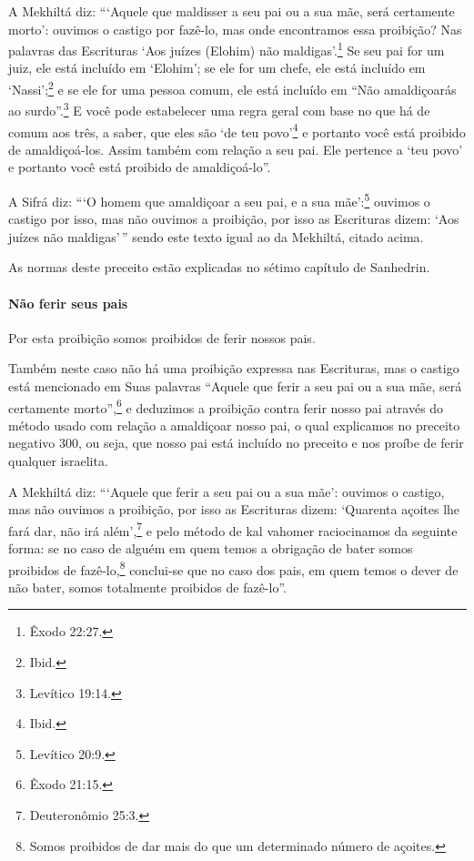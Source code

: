 A Mekhiltá diz: ```Aquele que maldisser a seu pai ou a sua mãe, será
certamente morto': ouvimos o castigo por fazê-lo, mas onde encontramos
essa proibição? Nas palavras das Escrituras `Aos juízes (Elohim) não
maldigas'.\footnote{Êxodo 22:27.} Se seu pai for um juiz, ele está incluído em
`Elohim'; se ele for um chefe, ele está incluído em
`Nassi';\footnote{Ibid.} e se ele for uma pessoa comum, ele está incluído em
``Não amaldiçoarás ao surdo''.\footnote{Levítico 19:14.} E você pode estabelecer
uma regra geral com base no que há de comum aos três, a saber, que eles
são `de teu povo'\footnote{Ibid.} e portanto você está proibido de
amaldiçoá-los. Assim também com relação a seu pai. Ele pertence a `teu
povo' e portanto você está proibido de amaldiçoá-lo''.

A Sifrá diz: ```O homem que amaldiçoar a seu pai, e a sua mãe':\footnote{Levítico
20:9.} ouvimos o castigo por isso, mas não ouvimos a proibição, por isso
as Escrituras dizem: `Aos juízes não maldigas'\,'' sendo este texto igual
ao da Mekhiltá, citado acima.

As normas deste preceito estão explicadas no sétimo capítulo de Sanhedrin.

\paragraph{Não ferir seus pais}

Por esta proibição somos proibidos de ferir nossos pais.

Também neste caso não há uma proibição expressa nas Escrituras, mas o
castigo está mencionado em Suas palavras ``Aquele que ferir a seu pai ou
a sua mãe, será certamente morto'',\footnote{Êxodo 21:15.} e deduzimos a
proibição contra ferir nosso pai através do método usado com relação a
amaldiçoar nosso pai, o qual explicamos no preceito negativo 300, ou
seja, que nosso pai está incluído no preceito e nos proíbe de ferir
qualquer israelita.

A Mekhiltá diz: ```Aquele que ferir a seu pai ou a sua mãe': ouvimos o
castigo, mas não ouvimos a proibição, por isso as Escrituras dizem:
`Quarenta açoites lhe fará dar, não irá além',\footnote{Deuteronômio 25:3.} e
pelo método de kal vahomer\starr{} raciocinamos da
seguinte forma: se no caso de alguém em quem temos a obrigação de bater
somos proibidos de fazê-lo,\footnote{Somos proibidos de dar mais do que um determinado número de açoites.} conclui-se que no caso
dos pais, em quem temos o dever de não bater, somos totalmente
proibidos de fazê-lo''.

